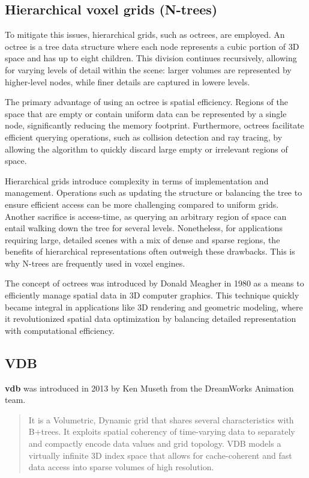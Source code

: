 \subsection{Hierarchical voxel grids (N-trees)}
To mitigate this issues, hierarchical grids, such as octrees, are employed. An octree is a tree data structure where each node represents a cubic portion of 3D space and has up to eight children. This division continues recursively, allowing for varying levels of detail within the scene: larger volumes are represented by higher-level nodes, while finer details are captured in lowere levels.

The primary advantage of using an octree is spatial efficiency. Regions of the space that are empty or contain uniform data can be represented by a single node, significantly reducing the memory footprint. Furthermore, octrees facilitate efficient querying operations, such as collision detection and ray tracing, by allowing the algorithm to quickly discard large empty or irrelevant regions of space.

Hierarchical grids introduce complexity in terms of implementation and management. Operations such as updating the structure or balancing the tree to ensure efficient access can be more challenging compared to uniform grids.
Another sacrifice is access-time, as querying an arbitrary region of space can entail walking down the tree for several levels.
Nonetheless, for applications requiring large, detailed scenes with a mix of dense and sparse regions, the benefits of hierarchical representations often outweigh these drawbacks. This is why N-trees are frequently used in voxel engines.

The concept of octrees was introduced by Donald Meagher in 1980\supercite{donald} as a means to efficiently manage spatial data in 3D computer graphics. This technique quickly became integral in applications like 3D rendering and geometric modeling, where it revolutionized spatial data optimization by balancing detailed representation with computational efficiency.

\subsection{VDB}

\textbf{\acrshort{vdb}} was introduced in 2013 by Ken Museth\supercite{vdb2013} from the DreamWorks Animation team.
\begin{quote}
It is a Volumetric, Dynamic grid that shares several characteristics with B+trees.
It exploits spatial coherency of time-varying data to separately and compactly encode data values and grid topology.
VDB models a virtually infinite 3D index space that allows for cache-coherent and fast data access into sparse volumes of high resolution.
\end{quote}


